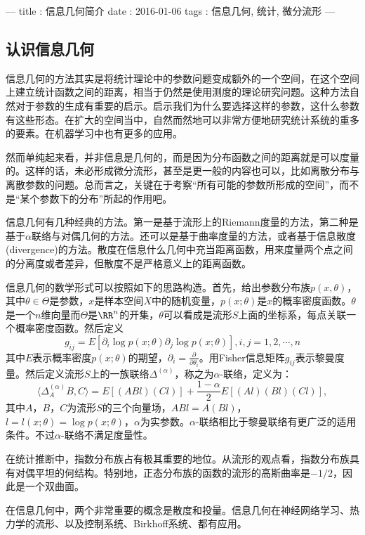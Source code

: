 ---
title : 信息几何简介
date  : 2016-01-06
tags  : 信息几何, 统计, 微分流形
---

\subsection{认识信息几何}

信息几何的方法其实是将统计理论中的参数问题变成额外的一个空间，在这个空间上建立统计函数之间的距离，相当于仍然是使用测度的理论研究问题。这种方法自然对于参数的生成有重要的启示。启示我们为什么要选择这样的参数，这什么参数有这些形态。在扩大的空间当中，自然而然地可以非常方便地研究统计系统的重多的要素。在机器学习中也有更多的应用。

然而单纯起来看，并非信息是几何的，而是因为分布函数之间的距离就是可以度量的。这样的话，未必形成微分流形，甚至是更一般的内容也可以，比如离散分布与离散参数的问题。总而言之，关键在于考察“所有可能的参数所形成的空间”，而不是“某个参数下的分布”所起的作用吧。

信息几何有几种经典的方法。第一是基于流形上的Riemann度量的方法，第二种是基于$\alpha$联络与对偶几何的方法。还可以是基于曲率度量的方法，或者基于信息散度(divergence)的方法。散度在信息什么几何中充当距离函数，用来度量两个点之间的分离度或者差异，但散度不是严格意义上的距离函数。

信息几何的数学形式可以按照如下的思路构造。首先，给出参数分布族$p(x,\theta)$，其中$\theta \in \Theta$是参数，$x$是样本空间$X$中的随机变量，$p(x;\theta)$是$x$的概率密度函数。$\theta$是一个$n$维向量而$\Theta$是$\RR^n$的开集，$\theta$可以看成是流形$S$上面的坐标系，每点关联一个概率密度函数。然后定义　
\[ g_{ij} = E[\partial_i \log p(x;\theta) \partial_j \log p(x;\theta)],
i,j=1,2,\cdots,n \]
其中$E$表示概率密度$p(x;\theta)$的期望，$\partial_i = \frac{\partial}{\partial \theta_i}$。用Fisher信息矩阵$g_{ij}$表示黎曼度量。然后定义流形$S$上的一族联络$\Delta^{(\alpha)}$，称之为$\alpha$-联络，定义为：
\[ \langle \Delta_A^{(\alpha)}B, C \rangle = E[(ABl)(Cl)] + 
    \frac{1-\alpha}{2} E[(Al)(Bl)(Cl)],
\]
其中$A$，$B$，$C$为流形$S$的三个向量场，$ABl=A(Bl)$，$l=l(x;\theta)=\log p(x;\theta)$，$\alpha$为实参数。$\alpha$-联络相比于黎曼联络有更广泛的适用条件。不过$\alpha$-联络不满足度量性。

在统计推断中，指数分布族占有极其重要的地位。从流形的观点看，指数分布族具有对偶平坦的何结构。特别地，正态分布族的函数的流形的高斯曲率是$-1/2$，因此是一个双曲面。

在信息几何中，两个非常重要的概念是散度和投量。信息几何在神经网络学习、热力学的流形、以及控制系统、Birkhoff系统、都有应用。


